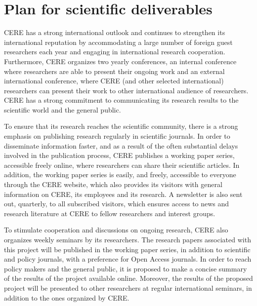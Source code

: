 \section{Plan for scientific deliverables}
CERE has a strong international outlook and continues to strengthen its international reputation by accommodating a large number of foreign guest researchers each year and engaging in international research cooperation. Furthermore, CERE organizes two yearly conferences, an internal conference where researchers are able to present their ongoing work and an external international conference, where CERE (and other selected international) researchers can present their work to other international audience of researchers. CERE has a strong commitment to communicating its research results to the scientific world and the general public.

To ensure that its research reaches the scientific community, there is a strong emphasis on publishing research regularly in scientific journals. In order to disseminate information faster, and as a result of the often substantial delays involved in the publication process, CERE publishes a working paper series, accessible freely online, where researchers can share their scientific articles. In addition, the working paper series is easily, and freely, accessible to everyone through the CERE website, which also provides its visitors with general information on CERE, its employees and its research. A newsletter is also sent out, quarterly, to all subscribed visitors, which ensures access to news and research literature at CERE to fellow researchers and interest groups.

To stimulate cooperation and discussions on ongoing research, CERE also organizes weekly seminars by its researchers. The research papers associated with this project will be published in the working paper series, in addition to scientific and policy journals, with a preference for Open Access journals. In order to reach policy makers and the general public, it is proposed to make a concise summary of the results of the project available online. Moreover, the results of the proposed project will be presented to other researchers at regular international seminars, in addition to the ones organized by CERE.

